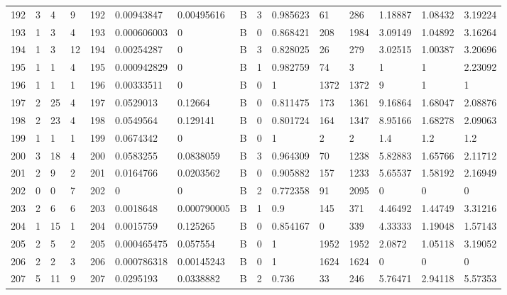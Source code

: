 \begin{latin}
\begin{longtable}{lllllllllllllll}
	192 & 3  & 4   & 9  & 192 & 0.00943847     & 0.00495616     & B & 3  & 0.985623 & 61   & 286  & 1.18887 & 1.08432 & 3.19224 \\
	193 & 1  & 3   & 4  & 193 & 0.000606003    & 0              & B & 0  & 0.868421 & 208  & 1984 & 3.09149 & 1.04892 & 3.16264 \\
	194 & 1  & 3   & 12 & 194 & 0.00254287     & 0              & B & 3  & 0.828025 & 26   & 279  & 3.02515 & 1.00387 & 3.20696 \\
	195 & 1  & 1   & 4  & 195 & 0.000942829    & 0              & B & 1  & 0.982759 & 74   & 3    & 1       & 1       & 2.23092 \\
	196 & 1  & 1   & 1  & 196 & 0.00333511     & 0              & B & 0  & 1        & 1372 & 1372 & 9       & 1       & 1       \\
	197 & 2  & 25  & 4  & 197 & 0.0529013      & 0.12664        & B & 0  & 0.811475 & 173  & 1361 & 9.16864 & 1.68047 & 2.08876 \\
	198 & 2  & 23  & 4  & 198 & 0.0549564      & 0.129141       & B & 0  & 0.801724 & 164  & 1347 & 8.95166 & 1.68278 & 2.09063 \\
	199 & 1  & 1   & 1  & 199 & 0.0674342      & 0              & B & 0  & 1        & 2    & 2    & 1.4     & 1.2     & 1.2     \\
	200 & 3  & 18  & 4  & 200 & 0.0583255      & 0.0838059      & B & 3  & 0.964309 & 70   & 1238 & 5.82883 & 1.65766 & 2.11712 \\
	201 & 2  & 9   & 2  & 201 & 0.0164766      & 0.0203562      & B & 0  & 0.905882 & 157  & 1233 & 5.65537 & 1.58192 & 2.16949 \\
	202 & 0  & 0   & 7  & 202 & 0              & 0              & B & 2  & 0.772358 & 91   & 2095 & 0       & 0       & 0       \\
	203 & 2  & 6   & 6  & 203 & 0.0018648      & 0.000790005    & B & 1  & 0.9      & 145  & 371  & 4.46492 & 1.44749 & 3.31216 \\
	204 & 1  & 15  & 1  & 204 & 0.0015759      & 0.125265       & B & 0  & 0.854167 & 0    & 339  & 4.33333 & 1.19048 & 1.57143 \\
	205 & 2  & 5   & 2  & 205 & 0.000465475    & 0.057554       & B & 0  & 1        & 1952 & 1952 & 2.0872  & 1.05118 & 3.19052 \\
	206 & 2  & 2   & 3  & 206 & 0.000786318    & 0.00145243     & B & 0  & 1        & 1624 & 1624 & 0       & 0       & 0       \\
	207 & 5  & 11  & 9  & 207 & 0.0295193      & 0.0338882      & B & 2  & 0.736    & 33   & 246  & 5.76471 & 2.94118 & 5.57353 \\

\end{longtable}
\end{latin}
